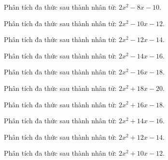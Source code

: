 \begin{bt}
	Phân tích đa thức sau thành nhân tử: $2 x^2 - 8 x - 10$.
\end{bt}
\begin{bt}
	Phân tích đa thức sau thành nhân tử: $2 x^2 - 10 x - 12$.
\end{bt}
\begin{bt}
	Phân tích đa thức sau thành nhân tử: $2 x^2 - 12 x - 14$.
\end{bt}
\begin{bt}
	Phân tích đa thức sau thành nhân tử: $2 x^2 - 14 x - 16$.
\end{bt}
\begin{bt}
	Phân tích đa thức sau thành nhân tử: $2 x^2 - 16 x - 18$.
\end{bt}
\begin{bt}
	Phân tích đa thức sau thành nhân tử: $2 x^2 + 18 x - 20$.
\end{bt}
\begin{bt}
	Phân tích đa thức sau thành nhân tử: $2 x^2 + 16 x - 18$.
\end{bt}
\begin{bt}
	Phân tích đa thức sau thành nhân tử: $2 x^2 + 14 x - 16$.
\end{bt}
\begin{bt}
	Phân tích đa thức sau thành nhân tử: $2 x^2 + 12 x - 14$.
\end{bt}
\begin{bt}
	Phân tích đa thức sau thành nhân tử: $2 x^2 + 10 x - 12$.
\end{bt}
